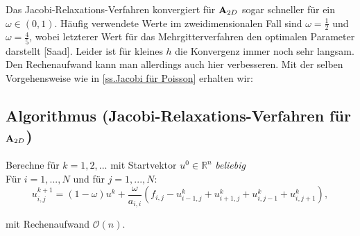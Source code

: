 Das Jacobi-Relaxations-Verfahren konvergiert für ${\textbf{A}}_{2D}$ sogar schneller für ein $\omega \in (0,1)$. Häufig verwendete Werte im zweidimensionalen Fall sind $\omega = \frac {1} {2}$ und $\omega = \frac {4} {5}$, wobei letzterer Wert für das Mehrgitterverfahren den optimalen Parameter darstellt [Saad]. Leider ist für kleines $h$ die Konvergenz immer noch sehr langsam. Den Rechenaufwand kann man allerdings auch hier verbesseren. Mit der selben Vorgehensweise wie in \autoref{ss.Jacobi für Poisson} erhalten wir:

\subsection{Algorithmus (Jacobi-Relaxations-Verfahren für ${\textbf{A}}_{2D}$)}\label{ss.Algorithmus Jacobi Relax Poisson}

Berechne für $k = 1,2,...$ mit Startvektor $u^{0} \in \mathbb{R}^{n}$ \textit{beliebig}\\
Für $i = 1,...,N$ und für $j = 1,...,N$:
\begin{equation}
u^{k+1}_{i,j} = (1 - \omega)u^{k} + \frac {\omega} {a_{i,i}} (f_{i,j} - u^{k}_{i-1,j} + u^{k}_{i+1,j} + u^{k}_{i,j-1} + u^{k}_{i,j+1}),
\end{equation}

mit Rechenaufwand $\mathcal{O}(n)$.






